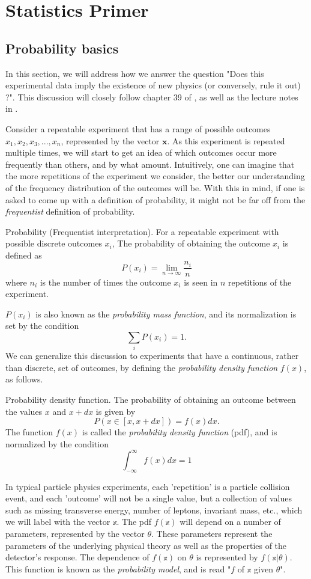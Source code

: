 \chapter{Statistics Primer}
\section{Probability basics}
In this section, we will address how we answer the question "Does this experimental data imply the existence of new physics (or conversely, rule it out) ?". This discussion will closely follow chapter 39 of \citep{Olive2016}, as well as the lecture notes in \citep{Cranmer2015}. 

Consider a repeatable experiment that has a range of possible outcomes $x_1,x_2,x_3,...,x_n$, represented by the vector $\mathbf{x}$. As this experiment is repeated multiple times, we will start to get an idea of which outcomes occur more frequently than others, and by what amount. Intuitively, one can imagine that the more repetitions of the experiment we consider, the better our understanding of the frequency distribution of the outcomes will be. With this in mind, if one is asked to come up with a definition of probability, it might not be far off from the \emph{frequentist} definition of probability.
\begin{definition}{Probability (Frequentist interpretation).}
For a repeatable experiment with possible discrete outcomes $x_i$, The probability of obtaining the outcome $x_i$ is defined as
\[P(x_i) = \lim_{n\rightarrow\infty}\frac{n_i}{n}\]
where $n_i$ is the number of times the outcome $x_i$ is seen in $n$ repetitions of the experiment.
\end{definition}
$P(x_i)$ is also known as the \emph{probability mass function}, and its normalization is set by the condition 
\[\sum_i P(x_i) = 1.\]
We can generalize this discussion to experiments that have a continuous, rather than discrete, set of outcomes, by defining the \emph{probability density function} $f(x)$, as follows.

\begin{definition}{Probability density function.}
The probability of obtaining an outcome between the values $x$ and $x+dx$ is given by
\[P(x\in[x,x+dx]) = f(x)dx.\]
The function $f(x)$ is called the \emph{probability density function} (pdf), and is normalized by the condition 
\[\int_{-\infty}^{\infty}f(x)dx = 1\]
\end{definition}

In typical particle physics experiments, each 'repetition' is a particle collision event, and each 'outcome' will not be a single value, but a collection of values such as missing transverse energy, number of leptons, invariant mass, etc., which we will label with the vector $\mathbb{x}$. The pdf $f(\mathbb{x})$ will depend on a number of parameters, represented by the vector $\mathbb{\theta}$. These parameters represent the parameters of the underlying physical theory as well as the properties of the detector's response. The dependence of $f(\mathbb{x})$ on $\mathbb{\theta}$ is represented by $f(\mathbb{x|\theta})$. This function is known as the \emph{probability model}, and is read "$f$ of $\mathbb{x}$ given $\mathbb{\theta}$".

